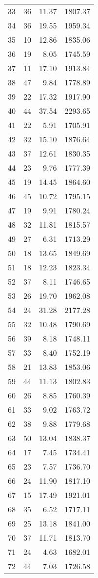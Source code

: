 \begin{appendix}
\begin{compacttable}
\begin{longtable}{@{}rrrr@{}}
33 & 36 & 11.37 & 1807.37 \\
34 & 36 & 19.55 & 1959.34 \\
35 & 10 & 12.86 & 1835.06 \\
36 & 19 & 8.05 & 1745.59 \\
37 & 11 & 17.10 & 1913.84 \\
38 & 47 & 9.84 & 1778.89 \\
39 & 22 & 17.32 & 1917.90 \\
40 & 44 & 37.54 & 2293.65 \\
41 & 22 & 5.91 & 1705.91 \\
42 & 32 & 15.10 & 1876.64 \\
43 & 37 & 12.61 & 1830.35 \\
44 & 23 & 9.76 & 1777.39 \\
45 & 19 & 14.45 & 1864.60 \\
46 & 45 & 10.72 & 1795.15 \\
47 & 19 & 9.91 & 1780.24 \\
48 & 32 & 11.81 & 1815.57 \\
49 & 27 & 6.31 & 1713.29 \\
50 & 18 & 13.65 & 1849.69 \\
51 & 18 & 12.23 & 1823.34 \\
52 & 37 & 8.11 & 1746.65 \\
53 & 26 & 19.70 & 1962.08 \\
54 & 24 & 31.28 & 2177.28 \\
55 & 32 & 10.48 & 1790.69 \\
56 & 39 & 8.18 & 1748.11 \\
57 & 33 & 8.40 & 1752.19 \\
58 & 21 & 13.83 & 1853.06 \\
59 & 44 & 11.13 & 1802.83 \\
60 & 26 & 8.85 & 1760.39 \\
61 & 33 & 9.02 & 1763.72 \\
62 & 38 & 9.88 & 1779.68 \\
63 & 50 & 13.04 & 1838.37 \\
64 & 17 & 7.45 & 1734.41 \\
65 & 23 & 7.57 & 1736.70 \\
66 & 24 & 11.90 & 1817.10 \\
67 & 15 & 17.49 & 1921.01 \\
68 & 35 & 6.52 & 1717.11 \\
69 & 25 & 13.18 & 1841.00 \\
70 & 37 & 11.71 & 1813.70 \\
71 & 24 & 4.63 & 1682.01 \\
72 & 44 & 7.03 & 1726.58 \\
\end{longtable}
\end{compacttable}


\end{appendix}

